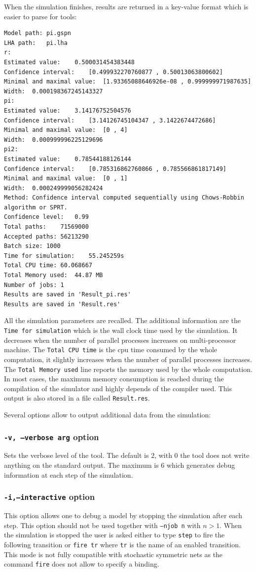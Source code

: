 \documentclass{article}
\begin{document}
When the simulation finishes, results are returned in a key-value
format which is easier to parse for tools:
\begin{scriptsize}
\begin{verbatim}
Model path:	pi.gspn
LHA path:	pi.lha
r:
Estimated value:	0.500031454383448
Confidence interval:	[0.499932270760877 , 0.50013063800602]
Minimal and maximal value:	[1.93365088646926e-08 , 0.999999971987635]
Width:	0.000198367245143327
pi:
Estimated value:	3.14176752504576
Confidence interval:	[3.14126745104347 , 3.1422674472686]
Minimal and maximal value:	[0 , 4]
Width:	0.000999996225129696
pi2:
Estimated value:	0.78544188126144
Confidence interval:	[0.785316862760866 , 0.785566861817149]
Minimal and maximal value:	[0 , 1]
Width:	0.000249999056282424
Method:	Confidence interval computed sequentially using Chows-Robbin algorithm or SPRT.
Confidence level:	0.99
Total paths:	71569000
Accepted paths:	56213290
Batch size:	1000
Time for simulation:	55.245259s
Total CPU time:	60.068667
Total Memory used:	44.87 MB
Number of jobs:	1
Results are saved in 'Result_pi.res'
Results are saved in 'Result.res'
\end{verbatim}
\end{scriptsize}
All the simulation parameters are recalled. The additional information
are the \texttt{Time for simulation} which is the wall clock time used
by the simulation.  It decreases when the number of parallel processes
increases on multi-processor machine.  The \texttt{Total CPU time} is
the cpu time consumed by the whole computation, it slightly increases
when the number of parallel processes increases. The \texttt{Total
  Memory used} line reports the memory used by the whole
computation. In most cases, the maximum memory consumption is reached
during the compilation of the simulator and highly depends of the
compiler used. This output is also stored in a file called
\texttt{Result.res}.

Several options allow to output additional data from the simulation:

\subsubsection{\texttt{-v, --verbose arg} option}
Sets the verbose level of the tool. The default is $2$, with $0$ the tool
does not write anything on the standard output. The maximum is $6$ which 
generates debug information at each step of the simulation.

\subsubsection{\texttt{-i,--interactive} option}
This option allows one to debug a model by stopping the simulation after
each step.  This option should not be used together with
\texttt{--njob n} with $n>1$.  When the simulation is stopped the user
is asked either to type \texttt{step} to fire the following transition
or \texttt{fire tr} where \texttt{tr} is the name of an enabled
transition. This mode is not fully compatible with stochastic
symmetric nets as the command \texttt{fire} does not allow to specify
a binding.
\end{document}
